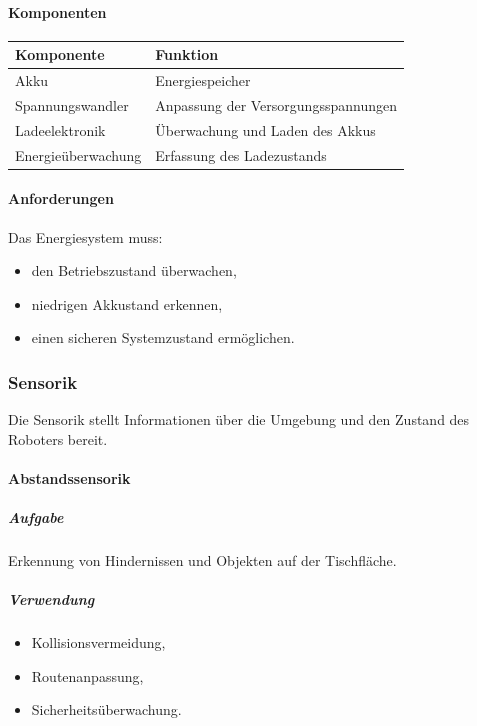 \paragraph{Komponenten}\label{komponenten-1}

\begin{longtable}[]{@{}ll@{}}
\toprule\noalign{}
Komponente & Funktion \\
\midrule\noalign{}
\endhead
\bottomrule\noalign{}
\endlastfoot
Akku & Energiespeicher \\
Spannungswandler & Anpassung der Versorgungsspannungen \\
Ladeelektronik & Überwachung und Laden des Akkus \\
Energieüberwachung & Erfassung des Ladezustands \\
\end{longtable}

\paragraph{Anforderungen}\label{anforderungen-2}

Das Energiesystem muss:

\begin{itemize}
\tightlist
\item
  den Betriebszustand überwachen,
\item
  niedrigen Akkustand erkennen,
\item
  einen sicheren Systemzustand ermöglichen.
\end{itemize}

\subsubsection{Sensorik}\label{sensorik-1}

Die Sensorik stellt Informationen über die Umgebung und den Zustand des
Roboters bereit.

\paragraph{Abstandssensorik}\label{abstandssensorik}

\subparagraph{Aufgabe}\label{aufgabe-3}

Erkennung von Hindernissen und Objekten auf der Tischfläche.

\subparagraph{Verwendung}\label{verwendung}

\begin{itemize}
\tightlist
\item
  Kollisionsvermeidung,
\item
  Routenanpassung,
\item
  Sicherheitsüberwachung.
\end{itemize}

